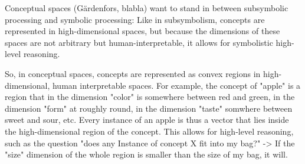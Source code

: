 


Conceptual spaces (Gärdenfors, blabla) want to stand in between subsymbolic processing and symbolic processing: Like in subsymbolism, concepts are represented in high-dimensional spaces, but because the dimensions of these spaces are not arbitrary but human-interpretable, it allows for symbolistic high-level reasoning.

So, in conceptual spaces, concepts are represented as convex regions in high-dimensional, human interpretable spaces. For example, the concept of "apple" is a region that in the dimension "color" is somewhere between red and green, in the dimension "form" at roughly round, in the dimension "taste" somwhere between sweet and sour, etc. 
Every instance of an apple is thus a vector that lies inside the high-dimensional region of the concept. This allows for high-level reasoning, such as the question "does any Instance of concept X fit into my bag?" -> If the "size" dimension of the whole region is smaller than the size of my bag, it will.

